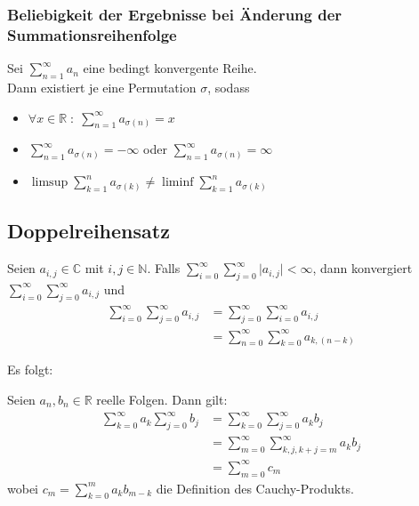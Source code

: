 \documentclass[halfparscip]{scrartcl}
\newcounter{subsection2}
\begin{document}
\subsubsection*{Beliebigkeit der Ergebnisse bei Änderung der Summationsreihenfolge}
Sei $\sum\limits_{n=1}^{\infty}a_n$ eine bedingt konvergente Reihe.\\
Dann existiert je eine Permutation $\sigma$, sodass
\begin{itemize}
	\item $\forall x \in \mathbb{R} \;:\; \sum\limits_{n=1}^{\infty}a_{\sigma(n)} = x$
	\item $\sum\limits_{n=1}^{\infty}a_{\sigma(n)} = -\infty$ oder $\sum\limits_{n=1}^{\infty}a_{\sigma(n)} = \infty$
	\item $\limsup \sum\limits_{k=1}^{n}a_{\sigma(k)} \neq \liminf \sum\limits_{k=1}^{n}a_{\sigma(k)}$
\end{itemize}
%

\pagebreak
\subsection{Doppelreihensatz}
Seien $a_{i,j} \in \mathbb{C}$ mit $i,j \in \mathbb{N}$. Falls $\sum\limits_{i=0}^{\infty}\sum\limits_{j=0}^\infty\vert a_{i,j}\vert < \infty$, dann konvergiert $\sum\limits_{i=0}^{\infty}\sum\limits_{j=0}^\infty a_{i,j}$ und
\begin{align*}
\sum\limits_{i=0}^{\infty}\sum\limits_{j=0}^\infty a_{i,j} &= \sum\limits_{j=0}^{\infty}\sum\limits_{i=0}^\infty a_{i,j} \\
&= \sum\limits_{n=0}^{\infty}\sum\limits_{k=0}^\infty a_{k,(n-k)}
\end{align*}

\noindent Es folgt:

Seien $a_n, b_n \in \mathbb{R}$ reelle Folgen. Dann gilt:
\begin{align*}
\sum_{k=0}^{\infty}a_k \sum_{j=0}^{\infty}b_j &= \sum_{k=0}^{\infty}\sum_{j=0}^\infty a_kb_j \\
&= \sum_{m=0}^{\infty}\sum_{k,j,k+j = m}^{\infty} a_kb_j \\
&= \sum_{m=0}^{\infty} c_m
\end{align*}
wobei $c_m = \sum\limits_{k=0}^ma_kb_{m-k}$ die Definition des Cauchy-Produkts.
\end{document}

